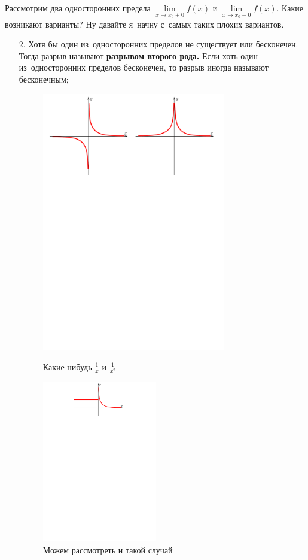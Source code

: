 \documentclass[a4paper,10pt,twoside]{article}
\begin{document}
Рассмотрим два односторонних предела $\lim\limits_{x\to x_0+0}f(x)$ и $\lim\limits_{x\to x_0-0}f(x)$. Какие возникают варианты? Ну давайте я~начну с~самых таких плохих вариантов.
\begin{itemize}
\item[2.] Хотя бы один из~односторонних пределов не существует или бесконечен. Тогда разрыв называют \textbf{разрывом второго рода.} Если хоть один из~односторонних пределов бесконечен, то разрыв иногда называют бесконечным;


\begin{figure}[htbp]
\centering
\begin{minipage}{0.45\textwidth}
\centering\includegraphics[width=80mm]{img/final/galat/20/1x1x2.pdf}
\caption{Какие нибудь $\frac1x$ и $\frac1{x^2}$}
\end{minipage}\qquad
\begin{minipage}{0.45\textwidth}
\centering\includegraphics[width=50mm]{img/final/galat/20/vc.pdf}
\caption{Можем рассмотреть и такой случай}
\end{minipage}
\end{figure}




\end{itemize}
\end{document}
